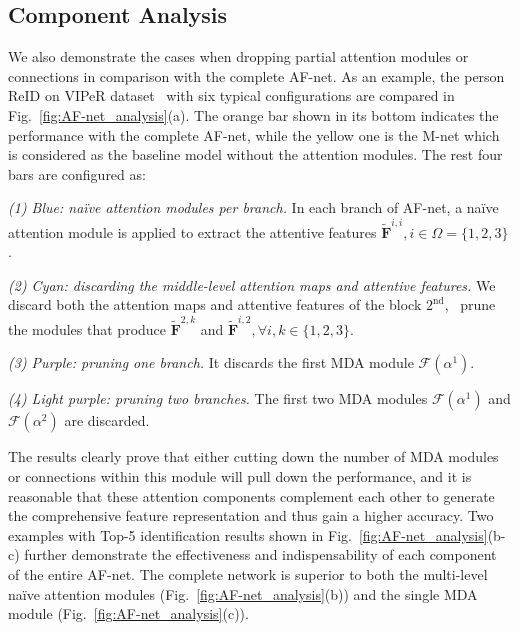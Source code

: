\documentclass[10pt,twocolumn,letterpaper]{article}
\begin{document}
\subsection{Component Analysis}
\label{subsec:component_analysis}

We also demonstrate the cases when dropping partial attention modules or connections in comparison with the complete AF-net.
As an example, the person ReID on VIPeR dataset~\cite{gray2007evaluating} with six typical configurations are compared in Fig.~\ref{fig:AF-net_analysis}(a).
The orange bar shown in its bottom indicates the performance with the complete AF-net, while the yellow one is the M-net which is considered as the baseline model without the attention modules.
The rest four bars are configured as:

\noindent\textit{(1) Blue: na\"ive attention modules per branch.} In each branch of AF-net, a na\"ive attention module is applied to extract the attentive features $\tilde{\mathbf{F}}^{i,i}, i\in\Omega=\lbrace 1, 2, 3\rbrace$.

\noindent\textit{(2) Cyan: discarding the middle-level attention maps and attentive features.} We discard both the attention maps and attentive features of the block $2^{\text{nd}}$, \ie~prune the modules that produce $\tilde{\mathbf{F}}^{2,k}$ and $\tilde{\mathbf{F}}^{i, 2}, \forall i, k \in \{1, 2, 3\}$.

\noindent\textit{(3) Purple: pruning one branch.} It discards the first MDA module $\mathcal{F}(\alpha^1)$.

\noindent\textit{(4) Light purple: pruning two branches.} The first two MDA modules $\mathcal{F}(\alpha^1)$ and $\mathcal{F}(\alpha^2)$ are discarded.

The results clearly prove that either cutting down the number of MDA modules or connections within this module will pull down the performance, and it is reasonable that these attention components complement each other to generate the comprehensive feature representation and thus gain a higher accuracy.
Two examples with Top-5 identification results shown in Fig.~\ref{fig:AF-net_analysis}(b-c) further demonstrate the effectiveness and indispensability of each component of the entire AF-net.
The complete network is superior to both the multi-level na\"ive attention modules (Fig.~\ref{fig:AF-net_analysis}(b)) and the single MDA module (Fig.~\ref{fig:AF-net_analysis}(c)).
\end{document}
